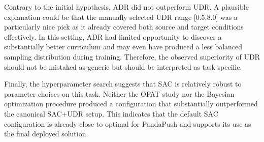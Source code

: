 Contrary to the initial hypothesis, ADR did not outperform UDR. A plausible explanation could be that the manually selected UDR range [0.5,8.0] was a particularly nice pick as it already covered both source and target conditions effectively. In this setting, ADR had limited opportunity to discover a substantially better curriculum and may even have produced a less balanced sampling distribution during training. Therefore, the observed superiority of UDR should not be mistaked as generic but should be interpreted as task-specific.

Finally, the hyperparameter search suggests that SAC is relatively robust to parameter choices on this task. Neither the OFAT study nor the Bayesian optimization procedure produced a configuration that substantially outperformed the canonical SAC+UDR setup. This indicates that the default SAC configuration is already close to optimal for PandaPush and supports its use as the final deployed solution.

